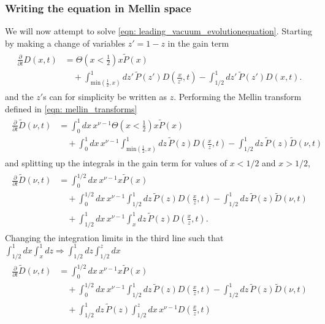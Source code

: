 \documentclass[main.tex]{subfiles}
\begin{document}
\subsubsection*{Writing the equation in Mellin space}
We will now attempt to solve \autoref{eqn: leading_vacuum_evolutionequation}. Starting by making a change of variables \(z'=1-z\) in the gain term
\begin{align}
    \begin{split}
    \frac{\partial}{\partial t} D(x,t) &= \Theta(x<\frac{1}{2})x \tilde{P}(x) \\
    &\quad + \int_{\text{min}(\frac{1}{2}, x)}^{1} dz' \, \tilde{P}(z') D(\frac{x}{z'},t) - \int_{1/2}^1 dz'\, \tilde{P}(z') D(x,t).
    \end{split}
\end{align}
and the \(z'\)s can for simplicity be written as \(z\). Performing the Mellin transform defined in \autoref{eqn: mellin_transforms}
\begin{align}
    \begin{split}
    \frac{\partial}{\partial t} \tilde{D}(\nu,t) &= \int_0^1 dx\, x^{\nu-1} \Theta(x<\frac{1}{2})x \tilde{P}(x) \\
    &\quad + \int_0^1 dx\, x^{\nu-1} \int_{\text{min}(\frac{1}{2}, x)}^{1} dz \, \tilde{P}(z) D(\frac{x}{z},t) -\int_{1/2}^1dz\, \tilde{P}(z) \tilde{D}(\nu,t)
    \end{split}
\end{align}
and splitting up the integrals in the gain term for values of \(x<1/2\) and \(x>1/2\),
\begin{align}
    \begin{split}
    \frac{\partial}{\partial t} \tilde{D}(\nu,t) &= \int_0^{1/2} dx\, x^{\nu-1} x \tilde{P}(x) \\
    &\quad + \int_0^{1/2} dx\, x^{\nu-1} \int_{1/2}^{1} dz \, \tilde{P}(z) D(\frac{x}{z},t) -\int_{1/2}^1dz\, \tilde{P}(z) \tilde{D}(\nu,t) \\
    &\quad + \int_{1/2}^1 dx\, x^{\nu-1} \int_{x}^{1} dz \, \tilde{P}(z) D(\frac{x}{z},t).
    \end{split}
\end{align}
Changing the integration limits in the third line such that 
\(\int_{1/2}^1dx \int_x^1 dz \Rightarrow \int_{1/2}^1 dz \int_{1/2}^z dx  \) 
\begin{align}
    \begin{split}
    \frac{\partial}{\partial t} \tilde{D}(\nu,t) &= \int_0^{1/2} dx\, x^{\nu-1} x \tilde{P}(x) \\
    &\quad + \int_0^{1/2} dx\, x^{\nu-1} \int_{1/2}^{1} dz \, \tilde{P}(z) D(\frac{x}{z},t) -\int_{1/2}^1dz\, \tilde{P}(z) \tilde{D}(\nu,t) \\
    &\quad + \int_{1/2}^{1} dz \, \tilde{P}(z) \int_{1/2}^z dx\, x^{\nu-1} D(\frac{x}{z},t)
    \end{split}
\end{align}
\end{document}
